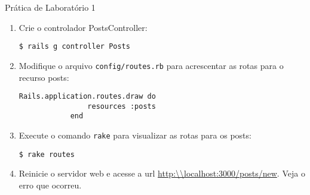 \begin{frame}{Prática de Laboratório 1}
\begin{enumerate}
		\item Crie o controlador PostsController:
		\begin{lstlisting}[style=BashInputBasicStyle]
			$ rails g controller Posts 		
		\end{lstlisting}

		\item Modifique o arquivo \verb|config/routes.rb| para acrescentar as rotas para
		o recurso posts:
		\begin{lstlisting}[style=RubyInputStyle]
			Rails.application.routes.draw do 
				resources :posts
			end 
		\end{lstlisting}	
		
		\item Execute o comando \verb!rake! para visualizar as rotas para os
		posts:
		\begin{lstlisting}[style=BashInputBasicStyle]
			$ rake routes
		\end{lstlisting}
		
		\item Reinicie o servidor web e acesse a url \url{http:\\localhost:3000/posts/new}. Veja o erro que ocorreu.

	\end{enumerate}
\end{frame}